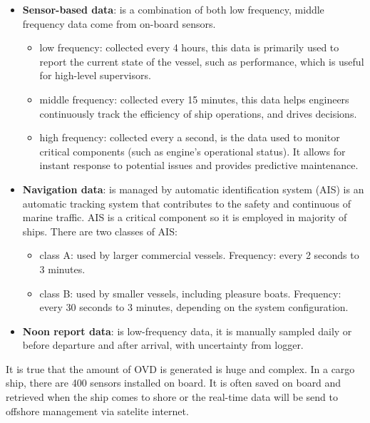 \begin{itemize}
    \item \textbf{Sensor-based data}: is a combination of both low frequency, middle frequency data come from on-board sensors.
        \begin{itemize}
        \item low frequency: collected every 4 hours, this data is primarily used to report the current state of the vessel, such as performance, which is useful for high-level supervisors.
        \item middle frequency: collected every 15 minutes, this data helps engineers continuously track the efficiency of ship operations, and drives decisions.
        \item high frequency: collected every a second, is the data used to monitor critical components (such as engine's operational status). It allows for instant response to potential issues and provides predictive maintenance.
        \end{itemize}
    \item \textbf{Navigation data}: is managed by automatic identification system (AIS) is an automatic tracking system that contributes to the safety and continuous of marine traffic. AIS is a critical component so it is employed in majority of ships. There are two classes of AIS:
        \begin{itemize}
        \item class A: used by larger commercial vessels. Frequency: every 2 seconds to 3 minutes. 
        \item class B: used by smaller vessels, including pleasure boats. Frequency: every 30 seconds to 3 minutes, depending on the system configuration.
        \end{itemize}
    \item \textbf{Noon report data}: is low-frequency data, it is manually sampled daily or before departure and after arrival, with uncertainty from logger.
\end{itemize}
        
It is true that the amount of OVD is generated is huge and complex. In a cargo ship, there are 400 sensors installed on board. It is often saved on board and retrieved when the ship comes to shore or the real-time data will be send to offshore management via satelite internet.



